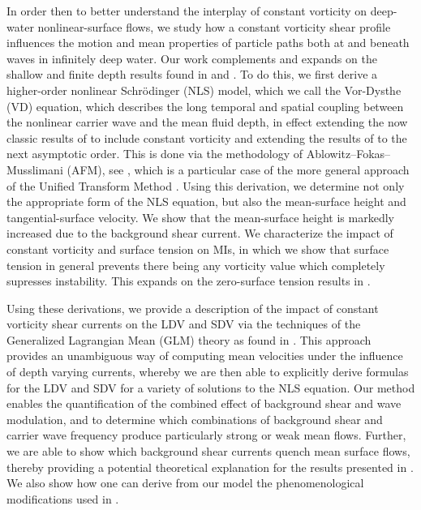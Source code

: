\documentclass{JFM_Style/jfm}
\begin{document}
In order then to better understand the interplay of constant vorticity on deep-water nonlinear-surface flows, we study how a constant vorticity shear profile influences the motion and mean properties of particle paths both at and beneath waves in infinitely deep water.  Our work complements and expands on the shallow and finite depth results found in \cite{wahlen2,constantin,borluk} and \cite{nachbin}.  To do this, we first derive a higher-order nonlinear Schr\"{o}dinger (NLS) model, which we call the Vor-Dysthe (VD) equation, which describes the long temporal and spatial coupling between the nonlinear carrier wave and the mean fluid depth, in effect extending the now classic results of \cite{dysthe} to include constant vorticity and extending the results of \cite{thomas2012nonlinear} to the next asymptotic order.  This is done via the methodology of Ablowitz--Fokas--Musslimani (AFM), see \cite{afm,ashton}, which is a particular case of the more general approach of the Unified Transform Method \cite{fokas2008}.  Using this derivation, we determine not only the appropriate form of the NLS equation, but also the mean-surface height and tangential-surface velocity. We show that the mean-surface height is markedly increased due to the background shear current.  We characterize the impact of constant vorticity and surface tension on MIs, in which we show that surface tension in general prevents there being any vorticity value which completely supresses instability.  This expands on the zero-surface tension results in \cite{thomas2012nonlinear}.  %

Using these derivations, we provide a description of the impact of constant vorticity shear currents on the LDV and SDV via the techniques of the Generalized Lagrangian Mean (GLM) theory as found in \cite{andrews,buhler}. This approach provides an unambiguous way of computing mean velocities under the influence of depth varying currents, whereby we are then able to explicitly derive formulas for the LDV and SDV for a variety of solutions to the NLS equation. Our method enables the quantification of the combined effect of background shear and wave modulation, and to determine which combinations of background shear and carrier wave frequency produce particularly strong or weak mean flows.  Further, we are able to show which background shear currents quench mean surface flows, thereby providing a potential theoretical explanation for the results presented in \cite{smith}. We also show how one can derive from our model the phenomenological modifications used in \cite{breivik}. 
\end{document}
